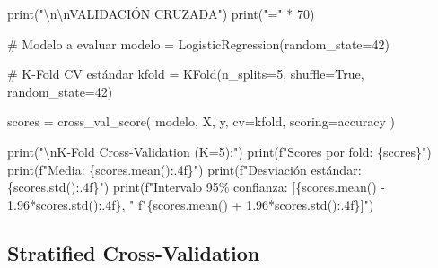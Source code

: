 \documentclass[
  doc,
  floatsintext,
  longtable,
  a4paper,
  nolmodern,
  notxfonts,
  notimes,
  12pt,
  colorlinks=true,linkcolor=blue,citecolor=blue,urlcolor=blue]{apa7}
\newenvironment{Shaded}{\begin{snugshade}}{\end{snugshade}}
\newcommand{\BuiltInTok}[1]{\textcolor[rgb]{0.00,0.23,0.31}{#1}}
\newcommand{\CharTok}[1]{\textcolor[rgb]{0.13,0.47,0.30}{#1}}
\newcommand{\CommentTok}[1]{\textcolor[rgb]{0.37,0.37,0.37}{#1}}
\newcommand{\DecValTok}[1]{\textcolor[rgb]{0.68,0.00,0.00}{#1}}
\newcommand{\FloatTok}[1]{\textcolor[rgb]{0.68,0.00,0.00}{#1}}
\newcommand{\NormalTok}[1]{\textcolor[rgb]{0.00,0.23,0.31}{#1}}
\newcommand{\OperatorTok}[1]{\textcolor[rgb]{0.37,0.37,0.37}{#1}}
\newcommand{\SpecialCharTok}[1]{\textcolor[rgb]{0.37,0.37,0.37}{#1}}
\newcommand{\SpecialStringTok}[1]{\textcolor[rgb]{0.13,0.47,0.30}{#1}}
\newcommand{\StringTok}[1]{\textcolor[rgb]{0.13,0.47,0.30}{#1}}
\newcommand{\VariableTok}[1]{\textcolor[rgb]{0.07,0.07,0.07}{#1}}
\begin{document}
\begin{Shaded}
\begin{Highlighting}[]
\BuiltInTok{print}\NormalTok{(}\StringTok{"}\CharTok{\textbackslash{}n\textbackslash{}n}\StringTok{VALIDACIÓN CRUZADA"}\NormalTok{)}
\BuiltInTok{print}\NormalTok{(}\StringTok{"="} \OperatorTok{*} \DecValTok{70}\NormalTok{)}

\CommentTok{\# Modelo a evaluar}
\NormalTok{modelo }\OperatorTok{=}\NormalTok{ LogisticRegression(random\_state}\OperatorTok{=}\DecValTok{42}\NormalTok{)}

\CommentTok{\# K{-}Fold CV estándar}
\NormalTok{kfold }\OperatorTok{=}\NormalTok{ KFold(n\_splits}\OperatorTok{=}\DecValTok{5}\NormalTok{, shuffle}\OperatorTok{=}\VariableTok{True}\NormalTok{, random\_state}\OperatorTok{=}\DecValTok{42}\NormalTok{)}

\NormalTok{scores }\OperatorTok{=}\NormalTok{ cross\_val\_score(}
\NormalTok{    modelo, X, y, }
\NormalTok{    cv}\OperatorTok{=}\NormalTok{kfold, }
\NormalTok{    scoring}\OperatorTok{=}\StringTok{\textquotesingle{}accuracy\textquotesingle{}}
\NormalTok{)}

\BuiltInTok{print}\NormalTok{(}\StringTok{"}\CharTok{\textbackslash{}n}\StringTok{K{-}Fold Cross{-}Validation (K=5):"}\NormalTok{)}
\BuiltInTok{print}\NormalTok{(}\SpecialStringTok{f"Scores por fold: }\SpecialCharTok{\{}\NormalTok{scores}\SpecialCharTok{\}}\SpecialStringTok{"}\NormalTok{)}
\BuiltInTok{print}\NormalTok{(}\SpecialStringTok{f"Media: }\SpecialCharTok{\{}\NormalTok{scores}\SpecialCharTok{.}\NormalTok{mean()}\SpecialCharTok{:.4f\}}\SpecialStringTok{"}\NormalTok{)}
\BuiltInTok{print}\NormalTok{(}\SpecialStringTok{f"Desviación estándar: }\SpecialCharTok{\{}\NormalTok{scores}\SpecialCharTok{.}\NormalTok{std()}\SpecialCharTok{:.4f\}}\SpecialStringTok{"}\NormalTok{)}
\BuiltInTok{print}\NormalTok{(}\SpecialStringTok{f"Intervalo 95\% confianza: [}\SpecialCharTok{\{}\NormalTok{scores}\SpecialCharTok{.}\NormalTok{mean() }\OperatorTok{{-}} \FloatTok{1.96}\OperatorTok{*}\NormalTok{scores}\SpecialCharTok{.}\NormalTok{std()}\SpecialCharTok{:.4f\}}\SpecialStringTok{, "}
      \SpecialStringTok{f"}\SpecialCharTok{\{}\NormalTok{scores}\SpecialCharTok{.}\NormalTok{mean() }\OperatorTok{+} \FloatTok{1.96}\OperatorTok{*}\NormalTok{scores}\SpecialCharTok{.}\NormalTok{std()}\SpecialCharTok{:.4f\}}\SpecialStringTok{]"}\NormalTok{)}
\end{Highlighting}
\end{Shaded}

\subsection{Stratified
Cross-Validation}\label{stratified-cross-validation}
\end{document}
